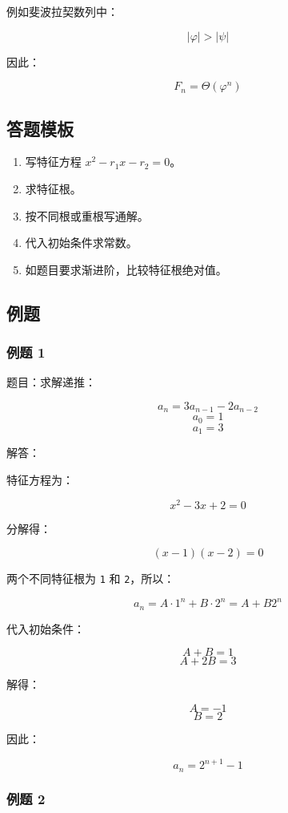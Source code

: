 \documentclass[UTF8,zihao=-4]{ctexart}
\begin{document}
例如斐波拉契数列中：

\[|\varphi| > |\psi|\]

因此：

\[F_{n} = \Theta(\varphi^{n})\]

\subsection*{答题模板}

\begin{enumerate}
\item 写特征方程 $x^2 - r_1 x - r_2 = 0$。
\item 求特征根。
\item 按不同根或重根写通解。
\item 代入初始条件求常数。
\item 如题目要求渐进阶，比较特征根绝对值。
\end{enumerate}

\subsection*{例题}

\subsubsection*{例题 1}

题目：求解递推：

\[a_{n} = 3a_{n-1} - 2a_{n-2}\]
\[a_{0} = 1\]
\[a_{1} = 3\]

解答：

特征方程为：

\[x^{2} - 3x + 2 = 0\]

分解得：

\[(x - 1)(x - 2) = 0\]

两个不同特征根为 \texttt{1} 和 \texttt{2}，所以：

\[a_{n} = A\cdot 1^{n} + B\cdot 2^{n} = A + B2^{n}\]

代入初始条件：

\[A + B = 1\]
\[A + 2B = 3\]

解得：

\[A = -1\]
\[B = 2\]

因此：

\[a_{n} = 2^{n+1} - 1\]

\subsubsection*{例题 2}
\end{document}
